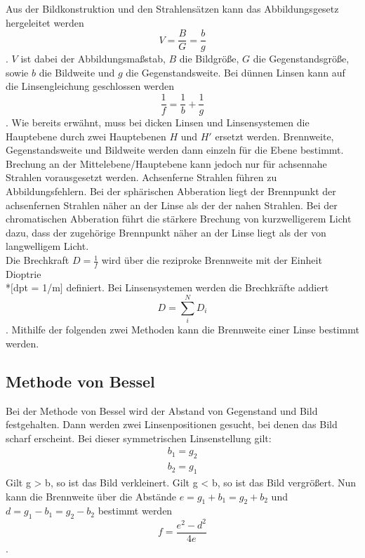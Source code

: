 Aus der Bildkonstruktion und den Strahlensätzen kann das Abbildungsgesetz hergeleitet werden
\begin{equation}
	V = \frac{B}{G} = \frac{b}{g}
\end{equation}.
$V$ ist dabei der Abbildungsma\ss{}stab, $B$ die Bildgrö\ss{}e, $G$ die Gegenstandsgrö\ss{}e, sowie $b$ die Bildweite und $g$ die Gegenstandsweite.
Bei dünnen Linsen kann auf die Linsengleichung geschlossen werden
\begin{equation}
	\frac{1}{f} = \frac{1}{b} + \frac{1}{g}
\end{equation}.
Wie bereits erwähnt, muss bei dicken Linsen und Linsensystemen die Hauptebene durch zwei Hauptebenen $H$ und $H'$ ersetzt werden. Brennweite, Gegenstandsweite und Bildweite werden dann einzeln für die Ebene bestimmt. \\

Brechung an der Mittelebene/Hauptebene kann jedoch nur für achsennahe Strahlen vorausgesetzt werden. Achsenferne Strahlen führen zu Abbildungsfehlern. 
Bei der sphärischen Abberation liegt der Brennpunkt der achsenfernen Strahlen näher an der Linse als der der nahen Strahlen. Bei der chromatischen Abberation führt die stärkere Brechung von kurzwelligerem Licht dazu, dass der zugehörige Brennpunkt näher an der Linse liegt als der von langwelligem Licht. \\

Die Brechkraft $D = \frac{1}{f}$ wird über die reziproke Brennweite mit der Einheit Dioptrie \\*$[$dpt = 1/m$]$ definiert. Bei Linsensystemen werden die Brechkräfte addiert
\begin{equation}
	D = \sum_{i}^N D_i
\end{equation}.
\newpage
Mithilfe der folgenden zwei Methoden kann die Brennweite einer Linse bestimmt werden.

\subsection{Methode von Bessel}
\label{Theorie/Bessel}
Bei der Methode von Bessel wird der Abstand von Gegenstand und Bild festgehalten. Dann werden zwei Linsenpositionen gesucht, bei denen das Bild scharf erscheint. Bei dieser symmetrischen Linsenstellung gilt:
\begin{gather*}
	b_1 = g_2 \\
	b_2 = g_1
\end{gather*}
Gilt g > b, so ist das Bild verkleinert. Gilt g < b, so ist das Bild vergrö\ss{}ert. Nun kann die Brennweite über die Abstände $e = g_1 + b_1 = g_2 + b_2$ und $d = g_1 - b_1 = g_2 - b_2$ bestimmt werden
\begin{equation}
	f = \frac{e^2 - d^2}{4e}
\end{equation}.

